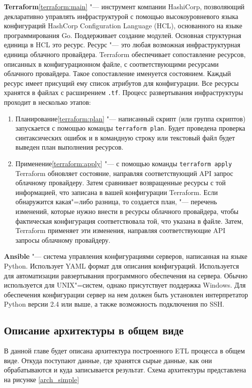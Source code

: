\documentclass[bachelor, och, pract]{SCWorks}
\begin{document}
\textbf{Terraform}\ref{terraform:main} "--- инструмент компании HashiCorp, позволяющий декларативно управлять инфраструктурой с помощью высокоуровневого языка конфигураций HashCorp Configuration Language (HCL), основанного на языке программирования Go. Поддерживает создание модулей. Основная структурная единица в HCL это ресурс. Ресурс "--- это любая возможная инфраструктурная единица облачного провайдера. Terraform обеспечивает сопоставление ресурсов, описанных в конфигурационном файле, с соответствующими ресурсами облачного провайдера. Такое сопоставление именуется состоянием.
Каждый ресурс имеет присущий ему список атрибутов для конфигурации. Все ресурсы хранятся в файлах с расширением \verb|.tf|. Процесс развертывания инфраструктуры проходит в несколько этапов:
\begin{enumerate}
	\item Планирование\ref{terraform:plan} "--- написанный скрипт (или группа скриптов) запускается с помощью команды \verb|terraform plan|. Будет проведена проверка синтаксических ошибок и в командную строку или текстовый файл будет выведен план выполнения ресурсов.
	\item Применение\ref{terraform:apply} "--- с помощью команды \verb|terraform apply| Terraform обновляет состояние, направляя соответствующий API запрос облачному провайдеру. Затем сравнивает возвращенные ресурсы с той информацией, что записана в вашей конфигурации Terraform. Если обнаружится какая"=либо разница, то создается план, "--- перечень изменений, которые нужно внести в ресурсы облачного провайдера, чтобы фактическая конфигурация соответствовала той, что указана в файле. Затем, Terraform применяет эти изменения, направляя соответствующие API запросы облачному провайдеру.
\end{enumerate}

\textbf{Ansible} "---  система управления конфигурациями серверов, написанная на языке Python. Использует YAML формат для описания конфигураций. Используется для автоматизации равзертывания программного обеспечения на сервера. Обычно используется для UNIX"=систем, однако присутствует поддержка Windows. Для обеспечения конфигурации сервер на нем должен быть установлен интерпретатор Python версии 2.4 или выше, а также возможность подключения по SSH.

\subsection{Описание архитектуры в общем виде}
В данной главе будет описана архитектура построенного ETL процесса в общем виде. Откуда поступают данные, где хранятся сырые данные, как они обрабатываются и куда записывается результат. Схема архитектуры представлена на рисунке \ref{arch_simple}
\end{document}
